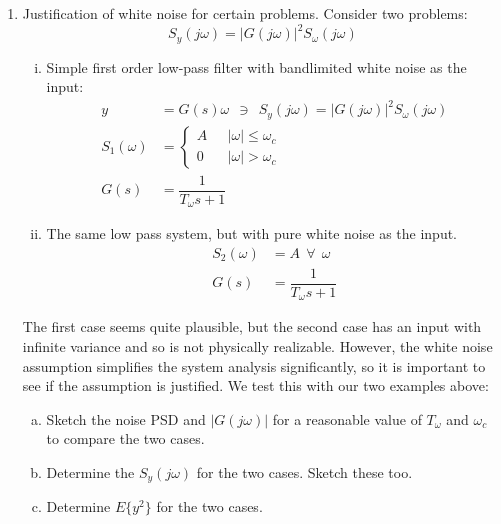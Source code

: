 \documentclass[11pt]{article}
\begin{document}
\begin{enumerate}[label=\textbf{\arabic*.}]
  \vspace{24pt}
  \item Justification of white noise for certain problems. Consider two 
  problems:
  \begin{equation*}
    S_y(j\omega) = |G(j\omega)|^2 S_{\omega}(j\omega)
  \end{equation*}
  \begin{enumerate}[(i)]
    \itemsep -2pt
    \item Simple first order low-pass filter with bandlimited white noise 
    as the input:
    \begin{equation*}
      \begin{split}
        y &= G(s)\omega \:\:\ni\:\: S_y(j\omega)=|G(j\omega)|^2S_{\omega}(j\omega) \\
        S_1(\omega) &= 
        \begin{cases}
          A & \mbox{ } |\omega| \le \omega_c \\
          0 & \mbox{ } |\omega| > \omega_c
        \end{cases} \\
        G(s) &= \dfrac{1}{T_{\omega}s+1}
      \end{split}
    \end{equation*}
    \item The same low pass system, but with pure white noise as the input.
    \begin{equation*}
      \begin{split}
        S_2(\omega) &= A \:\:\forall\:\: \omega \\
        G(s) &= \dfrac{1}{T_{\omega}s+1}
      \end{split}
    \end{equation*}
  \end{enumerate}
  The first case seems quite plausible, but the second case has an input with 
  infinite variance and so is not physically realizable. However, the white 
  noise assumption simplifies the system analysis significantly, so it is 
  important to see if the assumption is justified. We test this with our 
  two examples above: 
  \begin{enumerate}[(a)]
    \itemsep -2pt
    \item Sketch the noise PSD and $|G(j\omega)|$ for a reasonable value of 
    $T_{\omega}$ and $\omega_c$ to compare the two cases. 
    \item Determine the $S_y(j\omega)$ for the two cases.  Sketch these too. 
    \item Determine $E\{y^2\}$ for the two cases.

\end{enumerate}
\end{enumerate}
\end{document}
